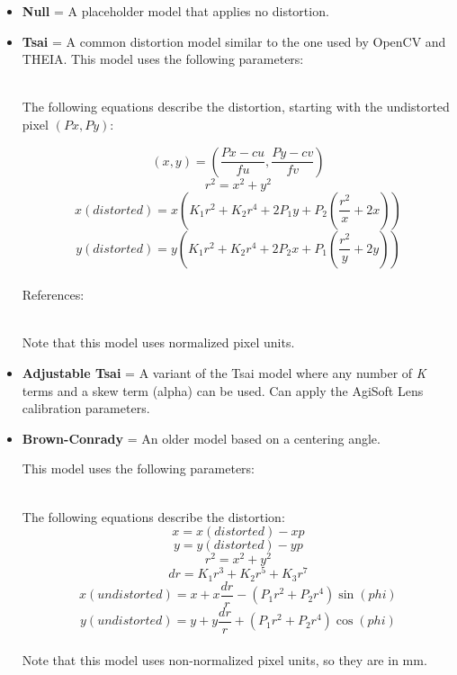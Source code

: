 \begin{itemize}{}
\item  \textbf{Null} = A placeholder model that applies no distortion.

\item  \textbf{Tsai} = A common distortion model similar to the one used by OpenCV and THEIA.
 This model uses the following parameters:
\hfill \\ The following equations describe the distortion, starting with the undistorted pixel $(Px, Py)$:

\[ (x, y) = \left(\frac{Px - cu}{fu}, \frac{Py-cv}{fv}\right) \]
\[ r^{2} = x^{2} + y^{2} \]
\[ x(distorted) = x\left(K_{1}r^{2} + K_{2}r^{4} + 2P_{1}y + P_{2}\left(\frac{r^{2}}{x} + 2x\right)\right)  \]
\[ y(distorted) = y\left(K_{1}r^{2} + K_{2}r^{4} + 2P_{2}x + P_{1}\left(\frac{r^{2}}{y} + 2y\right)\right)  \]
\hfill \\ References:
\hfill \\ Note that this model uses normalized pixel units.

\item  \textbf{Adjustable Tsai} = A variant of the Tsai model where any number of \textit{K} terms and a skew term (alpha) can be used.  Can apply the AgiSoft Lens calibration parameters.

\item  \textbf{Brown-Conrady} = An older model based on a centering angle.

 This model uses the following parameters:
\hfill \\ The following equations describe the distortion:
\[ x = x(distorted) - xp \]
\[ y = y(distorted) - yp \]
\[ r^{2} = x^{2} + y^{2} \]
\[ dr = K_{1}r^{3} + K_{2}r^{5} + K_{3}r^{7} \]
\[ x(undistorted) = x + x\frac{dr}{r} - (P_{1}r^{2} +P_{2}r^{4})\sin(phi) \]
\[ y(undistorted) = y + y\frac{dr}{r} + (P_{1}r^{2} +P_{2}r^{4})\cos(phi) \]
\hfill \\ Note that this model uses non-normalized pixel units, so they
are in mm.



\end{itemize}
